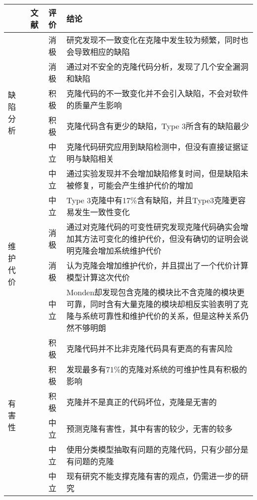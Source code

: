 \begin{table}[htbp]
\centering
{}\vspace{0.5em}\wuhao
\begin{tabularx}{0.9\textwidth}{lllX}
\toprule[1.5pt]
&文献&评价&结论\\
\midrule[1pt]
\multirow{6}{*}{缺陷分析} 
&\cite{juergens2009code}&消极&研究发现不一致变化在克隆中发生较为频繁，同时也会导致相应的缺陷\\
&\cite{gauthier2013uncovering}&消极&通过对不安全的克隆代码分析，发现了几个安全漏洞和缺陷\\
&\cite{bettenburg2009empirical}&积极&克隆代码的不一致变化并不会引入缺陷，不会对软件的质量产生影响\\
&\cite{elish2015fault}&积极&克隆代码含有更少的缺陷，Type 3所含有的缺陷最少\\
&\cite{lo2012active}&中立&克隆代码研究应用到缺陷检测中，但没有直接证据证明与缺陷相关\\
&\cite{kamei2011empirical}&中立	&通过实验发现并不会增加缺陷修复时间，但是缺陷未被修复，可能会产生维护代价的增加\\
\midrule[1pt]
\multirow{4}{*}{维护代价} 
&\cite{wagner2016relationship}&中立	&Type 3克隆中有17\%含有缺陷，并且Type3克隆更容易发生一致性变化\\
&\cite{harder2012controlled}&消极&通过对克隆代码的可变性研究发现克隆代码确实会增加其方法可变化的维护代价，但没有确切的证明会说明克隆会增加系统维护代价\\
&\cite{juergens2010much}&消极&认为克隆会增加维护代价，并且提出了一个代价计算模型计算这次代价\\
&\cite{monden2002software}&中立&Monden却发现包含克隆的模块比不含克隆的模块更可靠，同时含有大量克隆的模块却相反实验表明了克隆与系统可靠性和维护代价的关系，但是这种关系仍然不够明朗\\
\midrule[1pt]
\multirow{6}{*}{有害性} 
&\cite{selim2010studying}&积极&克隆代码并不比非克隆代码具有更高的有害风险\\
&\cite{kapser2006cloning}\cite{kapser2008cloning}&积极	&发现最多有71\%的克隆对系统的可维护性具有积极的影响\\
&\cite{rahman2012clones}&积极	&克隆并不是真正的代码坏位，克隆是无害的\\
&\cite{wang2012can}&中立	&预测克隆有害性，其中有害的较少，无害的较多\\
&\cite{higo2009problematic}&中立&使用分类模型抽取有问题的克隆代码，只有少部分是有问题的克隆\\
&\cite{hordijk2009harmfulness}&中立&现有研究不能支撑克隆有害的观点，仍需进一步的研究\\
\bottomrule[1.5pt]
\end{tabularx}
\end{table}

